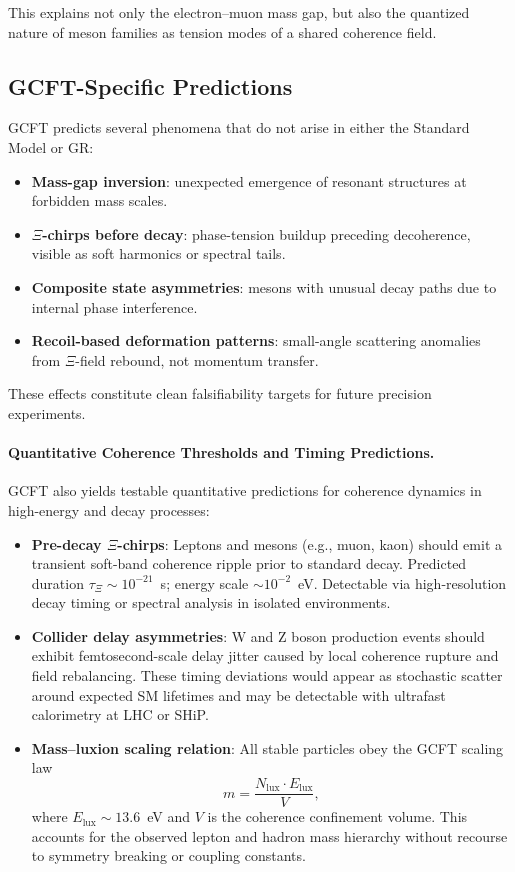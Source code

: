 This explains not only the electron–muon mass gap, but also the quantized nature of meson families as tension modes of a shared coherence field.

\subsection{GCFT-Specific Predictions}

GCFT predicts several phenomena that do not arise in either the Standard Model or GR:

\begin{itemize}
  \item \textbf{Mass-gap inversion}: unexpected emergence of resonant structures at forbidden mass scales.
  \item \textbf{$\Xi$-chirps before decay}: phase-tension buildup preceding decoherence, visible as soft harmonics or spectral tails.
  \item \textbf{Composite state asymmetries}: mesons with unusual decay paths due to internal phase interference.
  \item \textbf{Recoil-based deformation patterns}: small-angle scattering anomalies from $\Xi$-field rebound, not momentum transfer.
\end{itemize}

These effects constitute clean falsifiability targets for future precision experiments.

\paragraph{Quantitative Coherence Thresholds and Timing Predictions.}
GCFT also yields testable quantitative predictions for coherence dynamics in high-energy and decay processes:

\begin{itemize}
  \item \textbf{Pre-decay $\Xi$-chirps}: Leptons and mesons (e.g., muon, kaon) should emit a transient soft-band coherence ripple prior to standard decay. Predicted duration $\tau_{\Xi} \sim 10^{-21}$~s; energy scale $\sim 10^{-2}$~eV. Detectable via high-resolution decay timing or spectral analysis in isolated environments.
  
  \item \textbf{Collider delay asymmetries}: W and Z boson production events should exhibit femtosecond-scale delay jitter caused by local coherence rupture and field rebalancing. These timing deviations would appear as stochastic scatter around expected SM lifetimes and may be detectable with ultrafast calorimetry at LHC or SHiP.
  
  \item \textbf{Mass–luxion scaling relation}: All stable particles obey the GCFT scaling law
  \[
  m = \frac{N_\text{lux} \cdot E_\text{lux}}{V},
  \]
  where $E_\text{lux} \sim 13.6$~eV and $V$ is the coherence confinement volume. This accounts for the observed lepton and hadron mass hierarchy without recourse to symmetry breaking or coupling constants.
\end{itemize}

